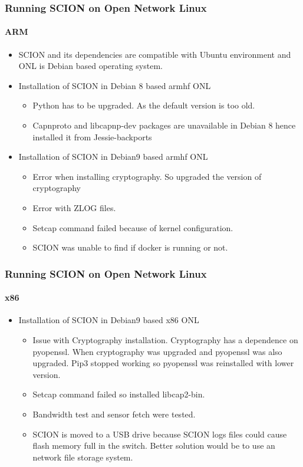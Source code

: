 \documentclass[12pt]{beamer}
\begin{document}
\begin{frame}
\frametitle{Running SCION on Open Network Linux}
\framesubtitle{ARM}
\begin{itemize}
    \item SCION and its dependencies are compatible with Ubuntu environment and ONL is Debian based operating system.
    \item Installation of SCION in Debian 8 based armhf ONL
    \begin{itemize}
        \item Python has to be upgraded. As the default version is too old. 
        \item Capnproto and libcapnp-dev packages are unavailable in Debian 8 hence installed it from Jessie-backports
    \end{itemize}
    \item Installation of SCION in Debian9 based armhf ONL
    \begin{itemize}
        \item Error when installing cryptography. So upgraded the version of cryptography
        \item Error with ZLOG files.
        \item Setcap command failed because of kernel configuration.
        \item SCION was unable to find if docker is running or not.
    \end{itemize}
\end{itemize}
\end{frame}

\begin{frame}
\frametitle{Running SCION on Open Network Linux}
\framesubtitle{x86}
\begin{itemize}
     \item Installation of SCION in Debian9 based x86 ONL
    \begin{itemize}
        \item Issue with Cryptography installation. Cryptography has a dependence on pyopenssl. When cryptography was upgraded and pyopenssl was also upgraded. Pip3 stopped working so pyopenssl was reinstalled with lower version.
        \item Setcap command failed so installed libcap2-bin.
        \item Bandwidth test and sensor fetch were tested.
        \item SCION is moved to a USB drive because SCION logs files could cause flash memory full in the switch. Better solution would be to use an network file storage system.
    \end{itemize}
\end{itemize}
\end{frame}
\end{document}
